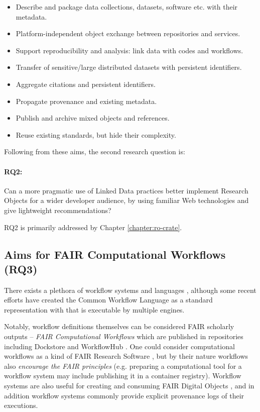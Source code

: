 \begin{itemize}
    \item Describe and package data collections, datasets, software etc. with their metadata.
    \item Platform-independent object exchange between repositories and services.
    \item Support reproducibility and analysis: link data with codes and workflows.
    \item Transfer of sensitive/large distributed datasets with persistent identifiers.
    \item Aggregate citations and persistent identifiers.
    \item Propagate provenance and existing metadata.
    \item Publish and archive mixed objects and references.
    \item Reuse existing standards, but hide their complexity.
\end{itemize}

Following from these aims, the second research question is: 

\paragraph{RQ2:}\label{rq2}  Can a more pragmatic use of Linked Data practices better implement Research Objects for a wider developer audience, by using familiar Web technologies and give lightweight recommendations?

RQ2 is primarily addressed by Chapter \ref{chapter:ro-crate}.


\subsection{Aims for FAIR Computational Workflows (RQ3)}
\label{intro:rq3}

There exists a plethora of \gls{workflow} systems and languages \cite{Leipzig 2021,Amstutz 2021}, although some recent efforts have created the Common Workflow Language \cite{Crusoe 2022} as a standard representation with  that is executable by multiple engines. 

Notably, workflow definitions themselves can be considered FAIR scholarly outputs \cite{Goble 2020} -- \emph{FAIR Computational Workflows} which are published in repositories including Dockstore \cite{Yuen 2021} and WorkflowHub \cite{Goble 2021}.
One could consider computational workflows as a kind of FAIR Research Software \cite{de Visser 2023}, but by their nature workflows also \emph{encourage the FAIR principles} (e.g. preparing a computational tool for a workflow system \cite{Brack 2022a} may include publishing it in a container registry). Workflow systems are also useful for creating and consuming FAIR Digital Objects \cite{Wittenburg 2022b}, and in addition workflow systems commonly provide explicit provenance logs of their executions.

